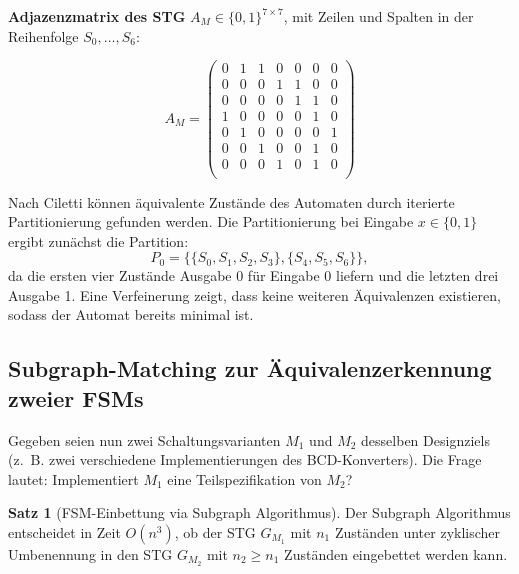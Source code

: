 ﻿\documentclass[a4paper,12pt]{article}
\theoremstyle{definition}
\newtheorem{satz}{Satz}
\begin{document}
\textbf{Adjazenzmatrix des STG} $A_M \in \{0,1\}^{7 \times 7}$, mit Zeilen und Spalten
in der Reihenfolge $S_0, \ldots, S_6$:

\[
A_M =
\begin{pmatrix}
  0 & 1 & 1 & 0 & 0 & 0 & 0 \\
  0 & 0 & 0 & 1 & 1 & 0 & 0 \\
  0 & 0 & 0 & 0 & 1 & 1 & 0 \\
  1 & 0 & 0 & 0 & 0 & 1 & 0 \\
  0 & 1 & 0 & 0 & 0 & 0 & 1 \\
  0 & 0 & 1 & 0 & 0 & 1 & 0 \\
  0 & 0 & 0 & 1 & 0 & 1 & 0 \\
\end{pmatrix}
\]

Nach Ciletti \cite[S.~95]{ciletti2011} können äquivalente Zustände des Automaten
durch iterierte Partitionierung gefunden werden. Die Partitionierung bei Eingabe
$x \in \{0,1\}$ ergibt zunächst die Partition:
\[
  P_0 = \{\{S_0, S_1, S_2, S_3\}, \{S_4, S_5, S_6\}\},
\]
da die ersten vier Zustände Ausgabe 0 für Eingabe 0 liefern und die letzten drei
Ausgabe 1. Eine Verfeinerung zeigt, dass keine weiteren Äquivalenzen existieren,
sodass der Automat bereits minimal ist.

\subsection{Subgraph-Matching zur Äquivalenzerkennung zweier FSMs}

Gegeben seien nun zwei Schaltungsvarianten $M_1$ und $M_2$ desselben Designziels
(z.~B. zwei verschiedene Implementierungen des BCD-Konverters). Die Frage lautet:
Implementiert $M_1$ eine Teilspezifikation von $M_2$?

\begin{satz}[FSM-Einbettung via Subgraph Algorithmus]\label{satz:fsm}
  Der Subgraph Algorithmus entscheidet in Zeit $O(n^3)$, ob der STG $G_{M_1}$ mit
  $n_1$ Zuständen unter zyklischer Umbenennung in den STG $G_{M_2}$ mit $n_2 \geq n_1$
  Zuständen eingebettet werden kann.
\end{satz}
\end{document}
